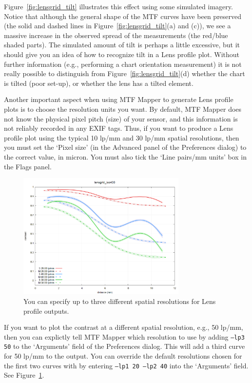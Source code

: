 \documentclass[a4paper]{article}
\begin{document}
Figure~\ref{fig:lensgrid_tilt} illustrates this effect using some simulated imagery.
Notice that although the general shape of the MTF curves have been preserved
(the solid and dashed lines in Figure~\ref{fig:lensgrid_tilt}(a) and (c)),
we see a massive increase in the observed spread of the measurements (the
red/blue shaded parts). The simulated amount of tilt is perhaps a little
excessive, but it should give you an idea of how to recognize tilt in a
\textsf{Lens profile} plot. Without further information (e.g., performing a
chart orientation measurement) it is not really possible to distinguish from
Figure~\ref{fig:lensgrid_tilt}(d) whether the chart is tilted (poor set-up),
or whether the lens has a tilted element.

Another important aspect when using MTF Mapper to generate \textsf{Lens
profile} plots is to choose the resolution units you want. By default, MTF
Mapper does not know the physical pixel pitch (size) of your sensor, and
this information is not reliably recorded in any EXIF tags. Thus, if you
want to produce a \textsf{Lens profile} plot using the typical 10 lp/mm and
30 lp/mm spatial resolutions, then you must set the `Pixel size' (in
the Advanced panel of the \textsf{Preferences dialog}) 
to the correct value, in micron. You must also tick the `Line pairs/mm units' box 
in the Flags panel.

\begin{figure}[!ht]
\centering
\includegraphics[width=0.75\textwidth]{figures/lens_profile_three.png}
\caption{You can specify up to three different spatial resolutions for
\textsf{Lens profile} outputs.}
\label{fig:lensgrid_three}
\end{figure}

If you want to plot the contrast at a different spatial resolution, e.g.,
50 lp/mm, then you can explictly tell MTF Mapper which resolution to use by
adding \texttt{--lp3 50} to the `Arguments' field of the
\textsf{Preferences} dialog. This will add a third curve for 50 lp/mm to the
output. You can override the default resolutions chosen for the first two
curves with by entering \texttt{--lp1 20 --lp2 40} into the `Arguments'
field. See Figure~\ref{fig:lensgrid_three}.
\end{document}
